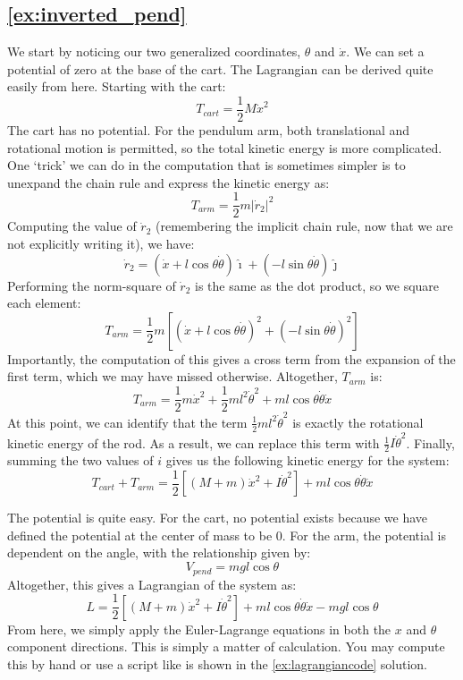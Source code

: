 \subsection*{\texorpdfstring{\autoref{ex:inverted_pend}}{Inverted Pendulum}}
We start by noticing our two \glspl{generalized coordinate}, $\theta$ and $\dot{x}$. We can set a potential of zero at the base of the cart. The \gls{Lagrangian} can be derived quite easily from here. Starting with the cart:
$$T_{cart}=\frac{1}{2}M\dot{x}^2$$
The cart has no potential. For the pendulum arm, both translational and rotational motion is permitted, so the total kinetic energy is more complicated. One `trick' we can do in the computation that is sometimes simpler is to unexpand the chain rule and express the kinetic energy as:
$$T_{arm}=\frac{1}{2}m|\dot{r}_2|^2$$
Computing the value of $\dot{r}_2$ (remembering the implicit chain rule, now that we are not explicitly writing it), we have:
$$\dot{r}_2=(\dot{x}+l\cos\theta\dot{\theta})\hat{\imath}+(-l\sin\theta\dot{\theta})\hat{\jmath}$$
Performing the norm-square of $\dot{r}_2$ is the same as the dot product, so we square each element:
$$T_{arm}=\frac{1}{2}m\left[(\dot{x}+l\cos\theta\dot{\theta})^2+(-l\sin\theta\dot{\theta})^2\right]$$
Importantly, the computation of this gives a cross term from the expansion of the first term, which we may have missed otherwise. Altogether, $T_{arm}$ is:
$$T_{arm}=\frac{1}{2}m\dot{x}^2+\frac{1}{2}ml^2\dot{\theta}^2+ml\cos\theta\dot\theta\dot{x}$$
At this point, we can identify that the term $\frac{1}{2}ml^2\dot{\theta}^2$ is exactly the rotational kinetic energy of the rod. As a result, we can replace this term with $\frac{1}{2}I\dot{\theta}^2$. Finally, summing the two values of $i$ gives us the following kinetic energy for the system:
$$T_{cart}+T_{arm}=\frac{1}{2}\left[\left(M+m\right)\dot{x}^2+I\dot{\theta}^2\right]+ml\cos\theta\dot{\theta}\dot{x}$$

The potential is quite easy. For the cart, no potential exists because we have defined the potential at the center of mass to be $0$. For the arm, the potential is dependent on the angle, with the relationship given by:
$$V_{pend}=mgl\cos{\theta}$$
Altogether, this gives a \gls{Lagrangian} of the system as:
$$L=\frac{1}{2}\left[\left(M+m\right)\dot{x}^2+I\dot{\theta}^2\right]+ml\cos\theta\dot{\theta}\dot{x}-mgl\cos{\theta}$$
From here, we simply apply the Euler-Lagrange equations in both the $x$ and $\theta$ component directions. This is simply a matter of calculation. You may compute this by hand or use a script like is shown in the \autoref{ex:lagrangiancode} solution.


